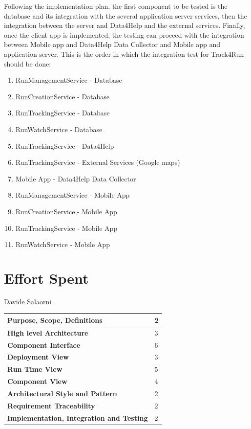 \documentclass[a4paper]{article}
\begin{document}
\noindent Following the implementation plan, the first component to be tested is the database and its integration with the several application server services, then the integration between the server and Data4Help and the external services.
Finally, once the client app is implemented, the testing can proceed with the integration between Mobile app and Data4Help Data Collector and Mobile app and application server.
\newline\newline This is the order in which the integration test for Track4Run should be done:

\begin{enumerate}[label*=\bf{\arabic*} . ]
    \item RunManagementService - Database
    \item RunCreationService - Database
    \item RunTrackingService - Database
    \item RunWatchService - Database
    \item RunTrackingService - Data4Help
    \item RunTrackingService - External Services (Google maps)
    \item Mobile App - Data4Help Data Collector
    \item RunManagementService - Mobile App
    \item RunCreationService - Mobile App
    \item RunTrackingService - Mobile App
    \item RunWatchService - Mobile App
\end{enumerate}

\clearpage

\section{Effort Spent}

Davide Salaorni

\begin{center}
\begin{tabular}{|l | l |}
    \hline \bf{Purpose, Scope, Definitions} & 2 \\ \hline
    \bf{High level Architecture}  & 3 \\ \hline
    \bf{Component Interface} & 6 \\ \hline
    \bf{Deployment View} & 3 \\ \hline
    \bf{Run Time View} & 5\\ \hline
    \bf{Component View} & 4 \\ \hline
    \bf{Architectural Style and Pattern} & 2 \\ \hline
    \bf{Requirement Traceability} & 2 \\ \hline
    \bf{Implementation, Integration and Testing} & 2 \\ \hline
\end{tabular}
\end{center}
\end{document}
